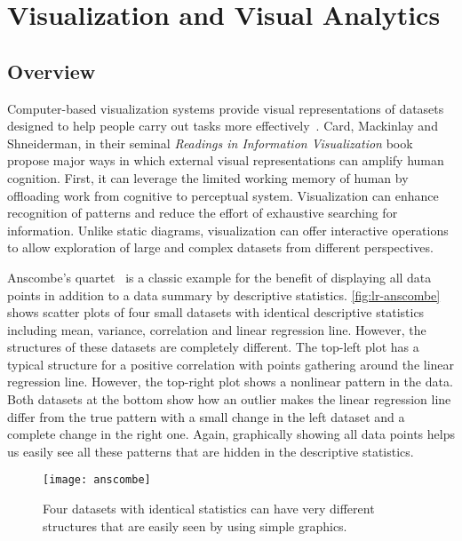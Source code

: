 \section{Visualization and Visual Analytics}

\subsection{Overview}
Computer-based visualization systems provide visual representations of datasets designed to help people carry out tasks more effectively~\cite{Munzner2014}. Card, Mackinlay and Shneiderman, in their seminal \emph{Readings in Information Visualization} book~\cite{Card1999} propose major ways in which external visual representations can amplify human cognition. First, it can leverage the limited working memory of human by offloading work from cognitive to perceptual system. Visualization can enhance recognition of patterns and reduce the effort of exhaustive searching for information. Unlike static diagrams, visualization can offer interactive operations to allow exploration of large and complex datasets from different perspectives.

Anscombe's quartet~\cite{Anscombe1973} is a classic example for the benefit of displaying all data points in addition to a data summary by descriptive statistics. \autoref{fig:lr-anscombe} shows scatter plots of four small datasets with identical descriptive statistics including mean, variance, correlation and linear regression line. However, the structures of these datasets are completely different. The top-left plot has a typical structure for a positive correlation with points gathering around the linear regression line. However, the top-right plot shows a nonlinear pattern in the data. Both datasets at the bottom show how an outlier makes the linear regression line differ from the true pattern with a small change in the left dataset and a complete change in the right one. Again, graphically showing all data points helps us easily see all these patterns that are hidden in the descriptive statistics.

\begin{figure}[!htb]
	\centering
	\texttt{[image: anscombe]}
	\caption{Four datasets with identical statistics can have
very different structures that are easily seen by using simple graphics. }
	\label{fig:lr-anscombe}
\end{figure}

